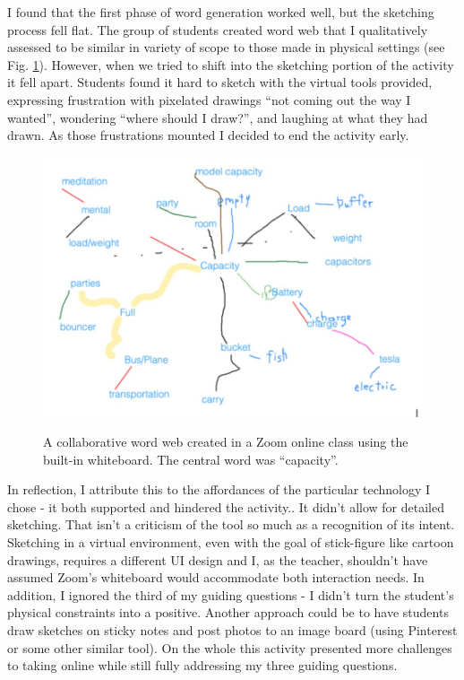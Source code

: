 \documentclass[journal]{vgtc}                %
\begin{document}
I found that the first phase of word generation worked well, but the sketching process fell flat. The group of students created word web that I qualitatively assessed to be similar in variety of scope to those made in physical settings (see Fig. \ref{fig:online_word_web}).  However, when we tried to shift into the sketching portion of the activity it fell apart. Students found it hard to sketch with the virtual tools provided, expressing frustration with pixelated drawings “not coming out the way I wanted”, wondering “where should I draw?”, and laughing at what they had drawn. As those frustrations mounted I decided to end the activity early. 

\begin{figure}[h]
  \centering
  \includegraphics[scale=0.26]{figures/figure3.jpg}
  \label{fig:online_word_web}
  \caption{A collaborative word web created in a Zoom online class using the built-in whiteboard. The central word was “capacity”.}
\end{figure}

In reflection, I attribute this to the affordances of the particular technology I chose - it both supported and hindered the activity.. It didn't allow for detailed sketching. That isn’t a criticism of the tool so much as a recognition of its intent. Sketching in a virtual environment, even with the goal of stick-figure like cartoon drawings, requires a different UI design and I, as the teacher, shouldn’t have assumed Zoom’s whiteboard would accommodate both interaction needs. In addition, I ignored the third of my guiding questions - I didn't turn the student's physical constraints into a positive. Another approach could be to have students draw sketches on sticky notes and post photos to an image board (using Pinterest or some other similar tool). On the whole this activity presented more challenges to taking online while still fully addressing my three guiding questions.
\end{document}
